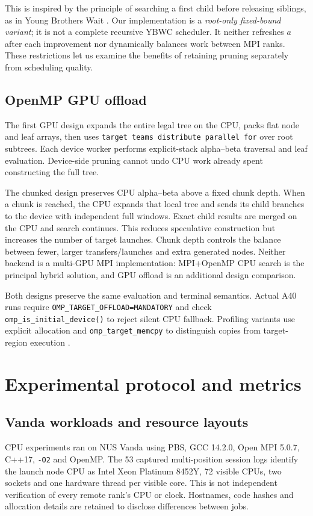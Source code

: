 \documentclass[11pt,a4paper]{article}
\newcommand{\code}[1]{\texttt{#1}}
\begin{document}
This is inspired by the principle of searching a first child before releasing
siblings, as in Young Brothers Wait \cite{feldmann}. Our implementation is a
\emph{root-only fixed-bound variant}; it is not a complete recursive YBWC
scheduler. It neither refreshes $a$ after each improvement nor dynamically
balances work between MPI ranks. These restrictions let us examine the benefits
of retaining pruning separately from scheduling quality.

\subsection{OpenMP GPU offload}
The first GPU design expands the entire legal tree on the CPU, packs flat node
and leaf arrays, then uses \code{target teams distribute parallel for} over
root subtrees. Each device worker performs explicit-stack alpha--beta traversal
and leaf evaluation. Device-side pruning cannot undo CPU work already spent
constructing the full tree.

The chunked design preserves CPU alpha--beta above a fixed chunk depth. When a
chunk is reached, the CPU expands that local tree and sends its child branches
to the device with independent full windows. Exact child results are merged on
the CPU and search continues. This reduces speculative construction but increases
the number of target launches. Chunk depth controls the balance between fewer,
larger transfers/launches and extra generated nodes. Neither backend is a
multi-GPU MPI implementation: MPI+OpenMP CPU search is the principal hybrid
solution, and GPU offload is an additional design comparison.

Both designs preserve the same evaluation and terminal semantics. Actual A40
runs require \code{OMP\_TARGET\_OFFLOAD=MANDATORY} and check
\code{omp\_is\_initial\_device()} to reject silent CPU fallback. Profiling variants
use explicit allocation and \code{omp\_target\_memcpy} to distinguish copies from
target-region execution \cite{openmp}.

\section{Experimental protocol and metrics}
\subsection{Vanda workloads and resource layouts}
CPU experiments ran on NUS Vanda using PBS, GCC 14.2.0, Open MPI 5.0.7, C++17,
\code{-O2} and OpenMP. The 53 captured multi-position session logs identify the
launch node CPU as Intel Xeon Platinum 8452Y, 72 visible CPUs, two sockets and
one hardware thread per visible core. This is not independent verification of
every remote rank's CPU or clock. Hostnames, code hashes and allocation details
are retained to disclose differences between jobs.
\end{document}
